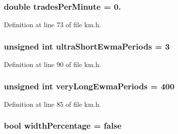 \subsubsection[{\texorpdfstring{trades\+Per\+Minute}{tradesPerMinute}}]{\setlength{\rightskip}{0pt plus 5cm}double trades\+Per\+Minute = 0.}\hypertarget{struct_k_1_1m_quoting_params_a4220b937e549b61ffd570c9e673ea8a8}{}\label{struct_k_1_1m_quoting_params_a4220b937e549b61ffd570c9e673ea8a8}


Definition at line 73 of file km.\+h.

\subsubsection[{\texorpdfstring{ultra\+Short\+Ewma\+Periods}{ultraShortEwmaPeriods}}]{\setlength{\rightskip}{0pt plus 5cm}unsigned int ultra\+Short\+Ewma\+Periods = 3}\hypertarget{struct_k_1_1m_quoting_params_a6eb0a78fa24178b92665467314fd1b1d}{}\label{struct_k_1_1m_quoting_params_a6eb0a78fa24178b92665467314fd1b1d}


Definition at line 90 of file km.\+h.

\subsubsection[{\texorpdfstring{very\+Long\+Ewma\+Periods}{veryLongEwmaPeriods}}]{\setlength{\rightskip}{0pt plus 5cm}unsigned int very\+Long\+Ewma\+Periods = 400}\hypertarget{struct_k_1_1m_quoting_params_af296a51a25b34f662a36db31a4481702}{}\label{struct_k_1_1m_quoting_params_af296a51a25b34f662a36db31a4481702}


Definition at line 85 of file km.\+h.

\subsubsection[{\texorpdfstring{width\+Percentage}{widthPercentage}}]{\setlength{\rightskip}{0pt plus 5cm}bool width\+Percentage = false}\hypertarget{struct_k_1_1m_quoting_params_a3e872a1d8d93fd696268d8abacb97736}{}\label{struct_k_1_1m_quoting_params_a3e872a1d8d93fd696268d8abacb97736}


